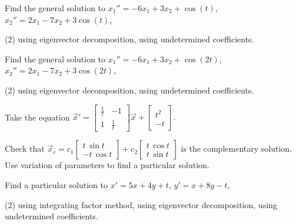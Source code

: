 \begin{exercise}
Find the general solution to
$x_1'' = -6x_1+ 3x_2 + \cos (t)$, 
$x_2'' = 2x_1 -7x_2 + 3\cos (t)$,
\begin{tasks}(2)
\task using eigenvector decomposition,
\task using undetermined coefficients.
\end{tasks}
\end{exercise}

\begin{exercise}
Find the general solution to
$x_1'' = -6x_1+ 3x_2 + \cos (2t)$, 
$x_2'' = 2x_1 -7x_2 + 3\cos (2t)$,
\begin{tasks}(2)
\task using eigenvector decomposition,
\task using undetermined coefficients.
\end{tasks}
\end{exercise}

\begin{exercise}
Take the equation
$\displaystyle
{\vec{x}}'
=
\begin{bmatrix}
\frac{1}{t} & -1 \\
1 & \frac{1}{t}
\end{bmatrix}
\vec{x}
+ \begin{bmatrix} t^2 \\ -t \end{bmatrix} .
$
\begin{tasks}
\task
Check that
$\displaystyle
\vec{x}_c =
c_1
\begin{bmatrix}
t\, \sin t \\
- t \, \cos t
\end{bmatrix}
+
c_2
\begin{bmatrix}
t\, \cos t \\
t \, \sin t
\end{bmatrix}
$
is the complementary solution.
\task
Use variation of parameters to
find a particular solution.
\end{tasks}
\end{exercise}

\setcounter{exercise}{100}

\begin{exercise}
Find a particular solution to $x' = 5x + 4y + t$, $y' = x + 8y - t$,
\begin{tasks}(2)
\task using integrating factor method,
\task using eigenvector decomposition,
\task using undetermined coefficients.
\end{tasks}
\end{exercise}


